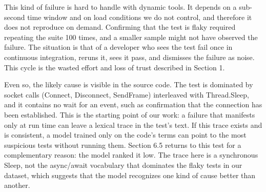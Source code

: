 This kind of failure is hard to handle with dynamic tools. It depends on a sub-second time window and on load conditions we do not control, and therefore it does not reproduce on demand. Confirming that the test is flaky required repeating the suite 100 times, and a smaller sample might not have observed the failure. The situation is that of a developer who sees the test fail once in continuous integration, reruns it, sees it pass, and dismisses the failure as noise. This cycle is the wasted effort and loss of trust described in Section 1.

Even so, the likely cause is visible in the source code. The test is dominated by socket calls (Connect, Disconnect, SendFrame) interleaved with Thread.Sleep, and it contains no wait for an event, such as confirmation that the connection has been established. This is the starting point of our work: a failure that manifests only at run time can leave a lexical trace in the test's text. If this trace exists and is consistent, a model trained only on the code's terms can point to the most suspicious tests without running them. Section 6.5 returns to this test for a complementary reason: the model ranked it low. The trace here is a synchronous Sleep, not the async/await vocabulary that dominates the flaky tests in our dataset, which suggests that the model recognizes one kind of cause better than another.
